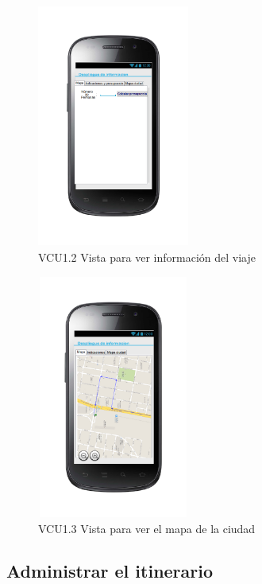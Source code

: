 \begin{figure}[h]
  \centering
    \includegraphics[width=5cm,height=8cm]{Imagenes/VistasSistema/CU1_2.png}
  \caption{VCU1.2 Vista para ver informaci\'on del viaje}  
\end{figure}

\begin{figure}[h]
  \centering
    \includegraphics[width=5cm,height=8cm]{Imagenes/VistasSistema/CU1_3.png}
  \caption{VCU1.3 Vista para ver el mapa de la ciudad}  
\end{figure}

\newpage
\subsection{Administrar el itinerario}

